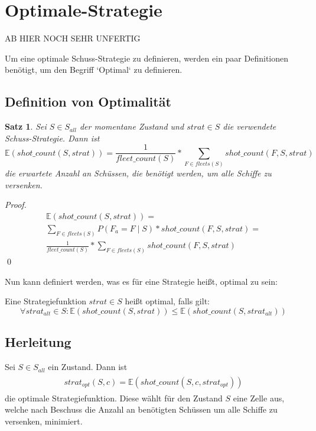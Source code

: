\documentclass[a4paper,12pt]{llncs}
\numberwithin{equation}{section}
\newtheorem{satz}{Satz}
\begin{document}
\section{Optimale-Strategie}

AB HIER NOCH SEHR UNFERTIG

Um eine optimale Schuss-Strategie zu definieren, werden ein paar Definitionen benötigt, um den Begriff `Optimal` zu definieren.

\subsection{Definition von Optimalität}

\begin{satz}
Sei $S\in S_{all}$ der momentane Zustand und $strat \in S$ die verwendete Schuss-Strategie.
Dann ist
\[
\mathds{E}(shot\_count(S, strat))=\frac{1}{fleet\_count(S)} * \sum_{F \in fleets(S)}{shot\_count(F, S, strat)}
\]
die erwartete Anzahl an Schüssen, die benötigt werden, um alle Schiffe zu versenken.
\end{satz}

\begin{proof}
\begin{align}
\mathds{E}(shot\_count(S, strat))=\\
\sum_{F \in fleets(S)}{P(F_a= F \mid S) * shot\_count(F, S, strat)} =\\
\frac{1}{fleet\_count(S)} * \sum_{F \in fleets(S)}{shot\_count(F, S, strat)}
\end{align}
\qed
\end{proof}

Nun kann definiert werden, was es für eine Strategie heißt, optimal zu sein:
\begin{definition}
Eine Strategiefunktion $strat \in S$ heißt optimal, falls gilt:
\[
\forall strat_{alt} \in S \colon \mathds{E}(shot\_count(S, strat)) \leq \mathds{E}(shot\_count(S, strat_{alt}))
\]
\end{definition}

\subsection{Herleitung}

\begin{definition}
Sei $S\in S_{all}$ ein Zustand.
Dann ist
\begin{align}
\begin{split}
strat_{opt}(S, c)=\mathds{E}(shot\_count(S, c, strat_{opt}))
\end{split}
\end{align}
die optimale Strategiefunktion.
Diese wählt für den Zustand $S$ eine Zelle aus, welche nach Beschuss die Anzahl an benötigten Schüssen um alle Schiffe zu versenken, minimiert.
\end{definition}
\end{document}
